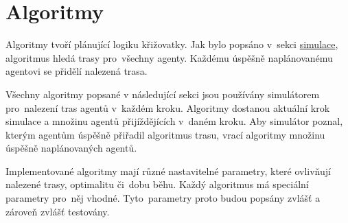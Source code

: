 \chapter{Algoritmy}\label{ch:algoritmy}

%

Algoritmy tvoří plánující logiku křižovatky.
Jak bylo popsáno v~sekci \hyperref[sec:simulace]{simulace}, algoritmus hledá trasy pro~všechny agenty.
Každému úspěšně naplánovanému agentovi se přidělí nalezená trasa.

Všechny algoritmy popsané v následující sekci jsou používány simulátorem pro~nalezení tras agentů v~každém kroku.
Algoritmy dostanou aktuální krok simulace a množinu agentů přijíždějících v~daném kroku.
Aby simulátor poznal, kterým agentům úspěšně přiřadil algoritmus trasu,
vrací algoritmy množinu úspěšně naplánovaných agentů.

Implementované algoritmy mají různé nastavitelné parametry, které ovlivňují nalezené trasy, optimalitu či~dobu běhu.
Každý algoritmus má speciální parametry pro~něj vhodné.
Tyto~parametry proto budou popsány zvlášť a zároveň zvlášť testovány.







%
